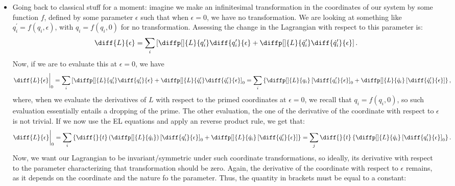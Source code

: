 \begin{itemize}
    \item Going back to classical stuff for a moment: imagine we make an infinitesimal transformation in the coordinates of our system by some function $f$, defined by some parameter $\epsilon$ such that when $\epsilon=0$, we have no transformation. We are looking at something like $q_i^{\prime} = f(q_i,\epsilon)$, with $q_i = f(q_i,0)$ for no transformation. Assessing the change in the Lagrangian with respect to this parameter is:
        \begin{equation*}
            \diff{L}{\epsilon} = \sum_i \left[\diffp[]{L}{q_i'}\diff{q_i'}{\epsilon} + \diffp[]{L}{\dot{q}_i'}\diff{\dot{q}_i'}{\epsilon}\right].
        \end{equation*}
        Now, if we are to evaluate this at $\epsilon=0$, we have
        \begin{equation*}
            \diff{L}{\epsilon}\bigg|_0 = \sum_i \left[\diffp[]{L}{q_i'}\diff{q_i'}{\epsilon} + \diffp[]{L}{\dot{q}_i'}\diff{\dot{q}_i'}{\epsilon}\right]_0 = \sum_i \left\{\diffp[]{L}{q_i}\left[\diff{q_i'}{\epsilon}\right]_0 + \diffp[]{L}{\dot{q}_i} \left[\diff{\dot{q}_i'}{\epsilon}\right]\right\},
        \end{equation*}
        where, when we evaluate the derivatives of $L$ with respect to the primed coordinates at $\epsilon=0$, we recall that $q_i = f(q_i,0)$, so such evaluation essentially entails a dropping of the prime. The other evaluation, the one of the derivative of the coordinate with respect to $\epsilon$ is not trivial.
        If we now use the EL equations and apply an reverse product rule, we get that:
        \begin{equation*}
            \diff{L}{\epsilon}\bigg|_0 = \sum_i \left\{\diff{}{t}\left(\diffp[]{L}{\dot{q}_i}\right)\left[\diff{q_i'}{\epsilon}\right]_0 + \diffp[]{L}{\dot{q}_i} \left[\diff{\dot{q}_i'}{\epsilon}\right]\right\} = \sum_j \diff{}{t} \left\{\diffp[]{L}{\dot{q}_i}\left[\diff{q_i'}{\epsilon}\right]_0\right\}.
        \end{equation*}
        Now, we want our Lagrangian to be invariant/symmetric under such coordinate transformations, so ideally, its derivative with respect to the parameter characterizing that transformation should be zero. Again, the derivative of the coordinate with respect to $\epsilon$ remains, as it depends on the coordinate and the nature fo the parameter. Thus, the quantity in brackets must be equal to a constant:
        \begin{equation}

\end{equation}
\end{itemize}
